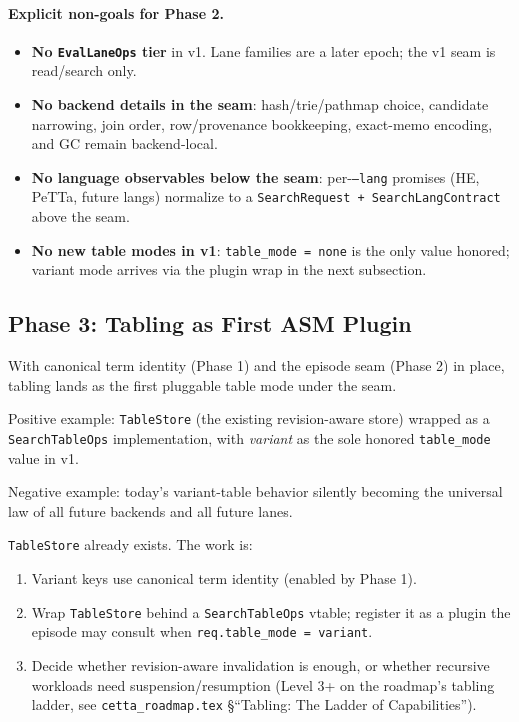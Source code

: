 \documentclass[11pt]{article}
\newcommand{\code}[1]{\texttt{#1}}
\newcommand{\HE}{\textup{HE}}
\newcommand{\PeTTa}{\textup{PeTTa}}
\begin{document}
\paragraph{Explicit non-goals for Phase 2.}
\begin{itemize}
\item \textbf{No \code{EvalLaneOps} tier} in v1.  Lane families are a
  later epoch; the v1 seam is read/search only.
\item \textbf{No backend details in the seam}: hash/trie/pathmap
  choice, candidate narrowing, join order, row/provenance bookkeeping,
  exact-memo encoding, and GC remain backend-local.
\item \textbf{No language observables below the seam}: per-\code{--lang}
  promises (\HE{}, \PeTTa{}, future langs) normalize to a
  \code{SearchRequest + SearchLangContract} above the seam.
\item \textbf{No new table modes in v1}: \code{table\_mode = none} is
  the only value honored; variant mode arrives via the plugin wrap in
  the next subsection.
\end{itemize}

\subsection{Phase 3: Tabling as First ASM Plugin}

With canonical term identity (Phase 1) and the episode seam (Phase 2)
in place, tabling lands as the first pluggable table mode under the
seam.

Positive example: \code{TableStore} (the existing revision-aware
store) wrapped as a \code{SearchTableOps} implementation, with
\emph{variant} as the sole honored \code{table\_mode} value in v1.

Negative example: today's variant-table behavior silently becoming
the universal law of all future backends and all future lanes.

\code{TableStore} already exists.  The work is:
\begin{enumerate}
\item Variant keys use canonical term identity (enabled by Phase 1).
\item Wrap \code{TableStore} behind a \code{SearchTableOps} vtable;
  register it as a plugin the episode may consult when
  \code{req.table\_mode = variant}.
\item Decide whether revision-aware invalidation is enough, or
  whether recursive workloads need suspension/resumption (Level 3+ on
  the roadmap's tabling ladder, see \code{cetta\_roadmap.tex}
  \S{}``Tabling: The Ladder of Capabilities'').
\end{enumerate}
\end{document}
